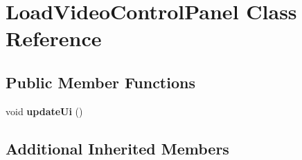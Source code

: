 \hypertarget{classGUI_1_1Player_1_1LoadVideoControlPanel}{}\section{Load\+Video\+Control\+Panel Class Reference}
\label{classGUI_1_1Player_1_1LoadVideoControlPanel}
\subsection*{Public Member Functions}
\begin{DoxyCompactItemize}
\item 
\hypertarget{classGUI_1_1Player_1_1LoadVideoControlPanel_ae13c7f95f1ceda0fec18d18c3d7619f6}{}void {\bfseries update\+Ui} ()\label{classGUI_1_1Player_1_1LoadVideoControlPanel_ae13c7f95f1ceda0fec18d18c3d7619f6}

\end{DoxyCompactItemize}
\subsection*{Additional Inherited Members}
